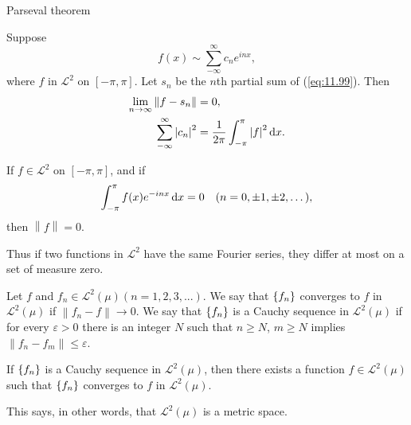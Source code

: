 Parseval theorem 
\begin{thm}
    \label{thm:11.40}
    Suppose 
    \begin{equation}
        \label{eq:11.99}
        f(x) \sim \sum_{-\infty}^{\infty} c_n e^{inx} ,
    \end{equation}
    where $f$ in $\mathscr{L}^2$ on $[-\pi, \pi]$.
    Let $s_n$ be the $n$th partial sum of (\ref{eq:11.99}).
    Then 
    \begin{align}
        \label{eq:11.100}
        \lim_{n \to \infty} \left\| f - s_n \right\| &= 0, \\
        \label{eq:11.101}
        \sum_{-\infty}^{\infty} \left| c_n \right|^2 &= 
        \frac{1}{2\pi} \int_{-\pi}^{\pi} \left| f \right|^2 \d x.
    \end{align}
\end{thm}

\begin{myCorollary*}
    If $f \in \mathscr{L}^2$ on $[-\pi, \pi]$, and if 
    \begin{equation*}
        \int_{-\pi}^{\pi} f(x) e^{-inx} \d x = 0
        \quad (n = 0, \pm 1, \pm 2, \dots),
    \end{equation*}
    then $\left\| f \right\| = 0$.
\end{myCorollary*}

Thus if two functions in $\mathscr{L}^2$ have the same Fourier series, 
they differ at most on a set of measure zero.

\begin{mydef}
    \label{mydef:11.41}
    Let $f$ and $f_n \in \mathscr{L}^2(\mu) (n = 1, 2, 3, ... )$. 
    We say that $\protect\{f_n\}$ converges to $f$ in $\mathscr{L}^2(\mu)$ if $\left\| f_n - f \right\| \rightarrow 0$. 
    We say that $\protect\{f_n\}$ is a Cauchy sequence in $\mathscr{L}^2(\mu)$ if for every $\varepsilon > 0$ there is an integer $N$ such that $n \geq N$, $m \geq N$ implies $\left\| f_n - f_m \right\| \leq \varepsilon$.
\end{mydef}

\begin{thm}
    \label{thm:11.42}
    If $\protect\{f_n\}$ is a Cauchy sequence in $\mathscr{L}^2(\mu)$, 
    then there exists a function $f \in \mathscr{L}^2(\mu)$ 
    such that $\protect\{f_n\}$ converges to $f$ in $\mathscr{L}^2(\mu)$.
\end{thm}

This says, in other words, that $\mathscr{L}^2(\mu)$ is a  metric space.

